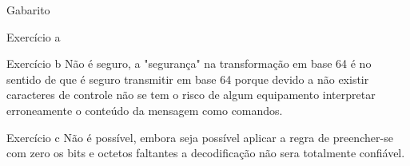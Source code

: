 \documentclass[pdf]{beamer}
\author{Welson Jr}
\begin{document}
\begin{frame}{Gabarito}
\begin{block}{Exercício a}
\begin{table}
\begin{center}
\end{center}
\end{table}
\end{block}
\begin{block}{Exercício b}
Não é seguro, a "segurança" na transformação em base 64 é no sentido de que é seguro transmitir em base 64 porque devido a não existir caracteres de controle não se tem o risco de algum equipamento interpretar erroneamente o conteúdo da mensagem como comandos.
\end{block}
\end{frame}
\begin{frame}
\begin{block}{Exercício c}
Não é possível, embora seja possível aplicar a regra de preencher-se com zero os bits e octetos faltantes a decodificação não sera totalmente confiável.
\end{block}
\end{frame}
\end{document}
